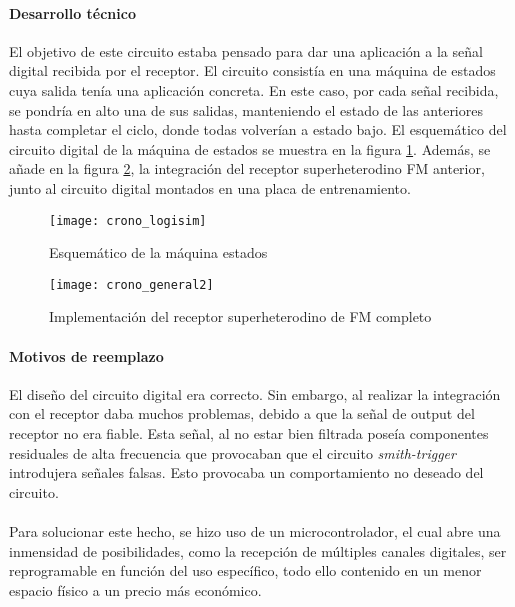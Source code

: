 \paragraph{Desarrollo técnico}
El objetivo de este circuito estaba pensado para dar una aplicaci\'on a la señal digital recibida por el receptor. El circuito consistía en una máquina de estados cuya salida tenía una aplicación concreta. En este caso, por cada señal recibida, se pondría en alto una de sus salidas, manteniendo el estado de las anteriores hasta completar el ciclo, donde todas volverían a estado bajo. 
El esquemático del circuito digital de la máquina de estados se muestra en la figura \ref{fig:crono_logisim}.
Además, se añade en la figura \ref{fig:crono_general}, la integración del receptor superheterodino FM anterior, junto al circuito digital montados en una placa de entrenamiento.

\begin{figure}[h!]
    \centering
    \texttt{[image: crono\_logisim]}
    \caption{Esquemático de la m\'aquina estados}
    \label{fig:crono_logisim}
\end{figure}

\begin{figure}[h!]
    \centering
    \texttt{[image: crono\_general2]}
    \caption{Implementaci\'on del receptor superheterodino de FM completo}
    \label{fig:crono_general}
\end{figure}

\paragraph{Motivos de reemplazo}
El diseño del circuito digital era correcto. Sin embargo, al realizar la integración con el receptor daba muchos problemas, debido a que la señal de output del receptor no era fiable. Esta señal, al no estar bien filtrada poseía componentes residuales de alta frecuencia que provocaban que el circuito \textit{smith-trigger} introdujera señales falsas. Esto provocaba un comportamiento no deseado del circuito. 
\paragraph{}
Para solucionar este hecho, se hizo uso de un microcontrolador, el cual abre una inmensidad de posibilidades, como la recepci\'on de múltiples canales digitales, ser reprogramable en función del uso específico, todo ello contenido en un menor espacio f\'isico a un precio más económico.
